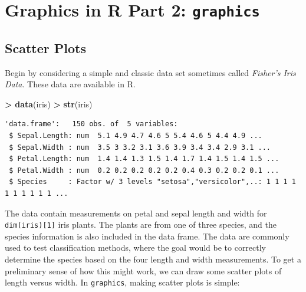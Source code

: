 \documentclass[
]{krantz}
\makeatletter
\newenvironment{Shaded}{\begin{snugshade}}{\end{snugshade}}
\newcommand{\DataTypeTok}[1]{\textcolor[rgb]{0.27,0.27,0.27}{#1}}
\newcommand{\KeywordTok}[1]{\textcolor[rgb]{0.27,0.27,0.27}{\textbf{#1}}}
\newcommand{\NormalTok}[1]{#1}
\newcommand{\OperatorTok}[1]{\textcolor[rgb]{0.43,0.43,0.43}{\textbf{#1}}}
\newcommand{\StringTok}[1]{\textcolor[rgb]{0.5,0.5,0.5}{#1}}
\newenvironment{kframe}{%
\medskip{}
\setlength{\fboxsep}{.8em}
 \def\at@end@of@kframe{}%
 \ifinner\ifhmode%
  \def\at@end@of@kframe{\end{minipage}}%
  \begin{minipage}{\columnwidth}%
 \fi\fi%
 \def\FrameCommand##1{\hskip\@totalleftmargin \hskip-\fboxsep
 \colorbox{shadecolor}{##1}\hskip-\fboxsep
     \hskip-\linewidth \hskip-\@totalleftmargin \hskip\columnwidth}%
 \MakeFramed {\advance\hsize-\width
   \@totalleftmargin\z@ \linewidth\hsize
   \@setminipage}}%
 {\par\unskip\endMakeFramed%
 \at@end@of@kframe}
\renewenvironment{Shaded}{\begin{kframe}}{\end{kframe}}
\makeatother
\begin{document}
\hypertarget{graphics}{%
\chapter{\texorpdfstring{Graphics in R Part 2: \texttt{graphics}}{Graphics in R Part 2: graphics}}\label{graphics}}

\hypertarget{scatter-plots-1}{%
\section{Scatter Plots}\label{scatter-plots-1}}

Begin by considering a simple and classic data set sometimes called \emph{Fisher's Iris Data}. These data are available in R.

\begin{Shaded}
\begin{Highlighting}[]
\OperatorTok{\textgreater{}}\StringTok{ }\KeywordTok{data}\NormalTok{(iris)}
\OperatorTok{\textgreater{}}\StringTok{ }\KeywordTok{str}\NormalTok{(iris)}
\end{Highlighting}
\end{Shaded}

\begin{verbatim}
'data.frame':   150 obs. of  5 variables:
 $ Sepal.Length: num  5.1 4.9 4.7 4.6 5 5.4 4.6 5 4.4 4.9 ...
 $ Sepal.Width : num  3.5 3 3.2 3.1 3.6 3.9 3.4 3.4 2.9 3.1 ...
 $ Petal.Length: num  1.4 1.4 1.3 1.5 1.4 1.7 1.4 1.5 1.4 1.5 ...
 $ Petal.Width : num  0.2 0.2 0.2 0.2 0.2 0.4 0.3 0.2 0.2 0.1 ...
 $ Species     : Factor w/ 3 levels "setosa","versicolor",..: 1 1 1 1 1 1 1 1 1 1 ...
\end{verbatim}

The data contain measurements on petal and sepal length and width for \texttt{dim(iris){[}1{]}} iris plants. The plants are from one of three species, and the species information is also included in the data frame. The data are commonly used to test classification methods, where the goal would be to correctly determine the species based on the four length and width measurements. To get a preliminary sense of how this might work, we can draw some scatter plots of length versus width. In \texttt{graphics}, making scatter plots is simple:

\begin{Shaded}
\end{Shaded}
\end{document}
